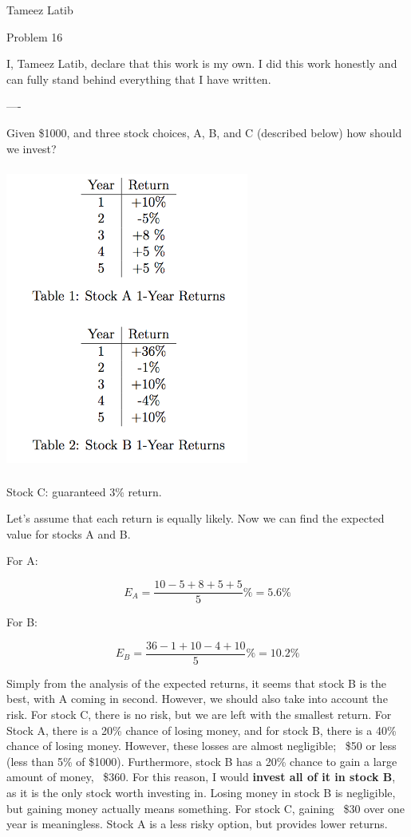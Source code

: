 \documentclass{article}
\begin{document}
Tameez Latib

Problem 16

I, Tameez Latib, declare that this work is my own. I did this work honestly and can fully stand behind everything that I have written.

----

Given \$1000, and three stock choices, A, B, and C (described below) how should we invest?


\includegraphics[width=8cm, height=10cm]{StockAB}

\vspace{1cm}

Stock C: guaranteed 3\% return.

Let's assume that each return is equally likely. Now we can find the expected value for stocks A and B. 

For A:

$$E_A = \frac{10 - 5 + 8 + 5 + 5}{5} \% = 5.6\%$$

For B:

$$E_B = \frac{36 - 1 + 10 - 4 + 10}{5} \% = 10.2\%$$

Simply from the analysis of the expected returns, it seems that stock B is the best, with A coming in second. However, we should also take into account the risk. For stock C, there is no risk, but we are left with the smallest return. For Stock A, there is a 20\% chance of losing money, and for stock B, there is a 40\% chance of losing money. However, these losses are almost negligible; ~\$50 or less (less than 5\% of \$1000). Furthermore, stock B has a 20\% chance to gain a large amount of money, ~\$360. For this reason, I would \textbf{invest all of it in stock B}, as it is the only stock worth investing in. Losing money in stock B is negligible, but gaining money actually means something. For stock C, gaining ~\$30 over one year is meaningless. Stock A is a less risky option, but provides lower returns.  
\end{document}
